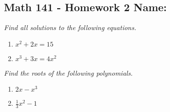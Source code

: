 \documentclass[11pt]{article}
\begin{document}
\pagestyle{empty}
\subsection*{Math 141 - Homework 2 \hfill Name: \underline{\hspace*{2in}}}
\textit{Find all solutions to the following equations.}

\begin{multicols}{2}
\begin{enumerate}
\item $x^2 + 2x = 15$
\item $x^3 + 3x = 4x^2$
\setcounter{enumCount}{\theenumi}
\end{enumerate}
\end{multicols}
\vfill

\noindent
\textit{Find the roots of the following polynomials.}
\begin{multicols}{2}
\begin{enumerate}
\setcounter{enumi}{\theenumCount}
\item $2x-x^3$
\item $\tfrac{1}{3}x^2 - 1$
\setcounter{enumCount}{\theenumi}
\end{enumerate}
\end{multicols}
\vfill
\end{document}
